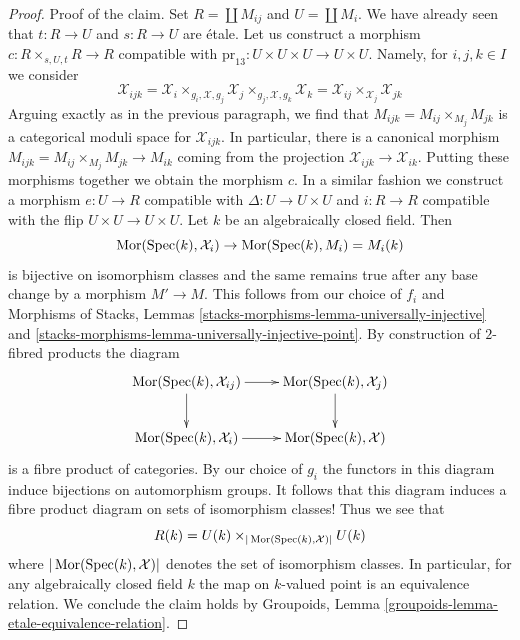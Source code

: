 \begin{proof}
\medskip\noindent
Proof of the claim. Set $R = \coprod M_{ij}$ and $U = \coprod M_i$.
We have already seen that $t : R \to U$ and $s : R \to U$ are \'etale.
Let us construct a morphism $c : R \times_{s, U, t} R \to R$
compatible with $\text{pr}_{13} : U \times U \times U \to U \times U$.
Namely, for $i, j, k \in I$ we consider
$$
\mathcal{X}_{ijk} =
\mathcal{X}_i \times_{g_i, \mathcal{X}, g_j} \mathcal{X}_j
\times_{g_j, \mathcal{X}, g_k} \mathcal{X}_k =
\mathcal{X}_{ij} \times_{\mathcal{X}_j} \mathcal{X}_{jk}
$$
Arguing exactly as in the previous paragraph,
we find that $M_{ijk} = M_{ij} \times_{M_j} M_{jk}$
is a categorical moduli space for $\mathcal{X}_{ijk}$.
In particular, there is a canonical morphism
$M_{ijk} = M_{ij} \times_{M_j} M_{jk} \to M_{ik}$
coming from the projection $\mathcal{X}_{ijk} \to \mathcal{X}_{ik}$.
Putting these morphisms together we obtain the morphism $c$.
In a similar fashion we construct a morphism $e : U \to R$
compatible with $\Delta : U \to U \times U$ and
$i : R \to R$ compatible with the flip $U \times U \to U \times U$.
Let $k$ be an algebraically closed field. Then
$$
\mathop{\mathrm{Mor}}\nolimits(\mathop{\mathrm{Spec}}(k), \mathcal{X}_i) \to \mathop{\mathrm{Mor}}\nolimits(\mathop{\mathrm{Spec}}(k), M_i) = M_i(k)
$$
is bijective on isomorphism classes and the same remains true after any
base change by a morphism $M' \to M$. This follows from our choice
of $f_i$ and Morphisms of Stacks, Lemmas
\ref{stacks-morphisms-lemma-universally-injective} and
\ref{stacks-morphisms-lemma-universally-injective-point}.
By construction of $2$-fibred products the diagram
$$
\xymatrix{
\Mor(\Spec(k), \mathcal{X}_{ij}) \ar[d] \ar[r] &
\Mor(\Spec(k), \mathcal{X}_j) \ar[d] \\
\Mor(\Spec(k), \mathcal{X}_i) \ar[r] &
\Mor(\Spec(k), \mathcal{X})
}
$$
is a fibre product of categories. By our choice of $g_i$ the
functors in this diagram induce bijections on automorphism groups.
It follows that this diagram induces a fibre product diagram
on sets of isomorphism classes! Thus we see that
$$
R(k) = U(k) \times_{|\mathop{\mathrm{Mor}}\nolimits(\mathop{\mathrm{Spec}}(k), \mathcal{X})|} U(k)
$$
where $|\mathop{\mathrm{Mor}}\nolimits(\mathop{\mathrm{Spec}}(k), \mathcal{X})|$ denotes the set
of isomorphism classes.
In particular, for any algebraically closed field $k$
the map on $k$-valued point is an equivalence relation.
We conclude the claim holds by
Groupoids, Lemma \ref{groupoids-lemma-etale-equivalence-relation}.


\end{proof}
